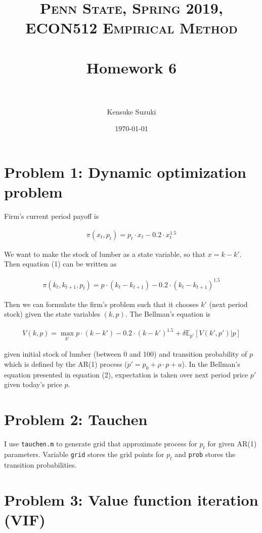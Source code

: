 \documentclass[11pt,letter]{article}
\title{	
\normalfont \normalsize 
\textsc{Penn State, Spring 2019, ECON512 Empirical Method} \\ [25pt] %
\horrule{0.5pt} \\[0.4cm] %
\huge Homework 6 \\ %
\horrule{2pt} \\[0.5cm] %
}
\author{Kensuke Suzuki} %
\date{\normalsize\today} %
\newcounter{lem}[section] \setcounter{lem}{0}
\newcommand{\lprn}[1]{\left[{#1}\right]}
\newcommand{\code}[1]{\texttt{#1}}
\begin{document}
\maketitle %


\section*{Problem 1: Dynamic optimization problem}

Firm's current period payoff is

\begin{align}
\pi(x_t, p_t) = p_t \cdot x_t - 0.2 \cdot x_t^{1.5} 
\end{align}

We want to make the stock of lumber as a state variable, so that $x=k-k'$.  Then equation (1) can be written as

\begin{align}
\pi(k_t,k_{t+1},p_t) = p \cdot (k_{t}-k_{t+1}) - 0.2 \cdot (k_{t}-k_{t+1})^{1.5}
\end{align}

Then we can formulate the firm's problem such that it chooses $k'$ (next period stock) given the state variables $(k,p)$. The Bellman's equation is

\begin{align}
V(k,p) = \max_{k'}  p \cdot (k-k') - 0.2 \cdot (k-k')^{1.5} + \delta \mathbb{E}_{p'}\lprn{V(k',p')|p}
\end{align}

given initial stock of lumber (between 0 and 100) and transition probability of $p$ which is defined by the AR(1) process ($p'= p_0 + \rho\cdot p + u$). In the Bellman's equation presented in equation (2), expectation is taken over next period price $p'$ given today's price $p$.


\section*{Problem 2: Tauchen}

I use \code{tauchen.m} to generate grid that approximate process for $p_t$ for given AR(1) parameters. Variable \code{grid} stores the grid points for $p_t$ and \code{prob} stores the transition probabilities.

\newpage
\section*{Problem 3: Value function iteration (VIF)}
\end{document}
